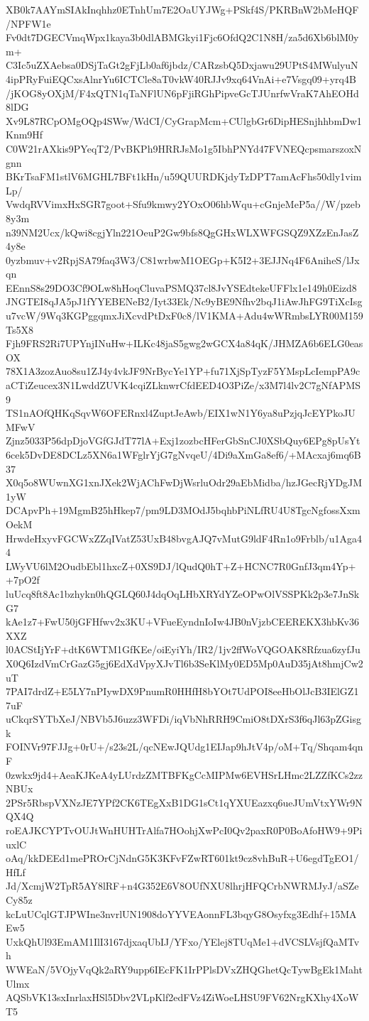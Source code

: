 XB0k7AAYmSIAkInqhhz0ETnhUm7E2OaUYJWg+PSkf4S/PKRBnW2bMeHQF/NPFW1e
Fv0dt7DGECVmqWpx1kaya3b0dlABMGkyi1Fjc6OfdQ2C1N8H/za5d6Xb6blM0ym+
C3Ic5uZXAebsa0DSjTaGt2gFjLb0af6jbdz/CARzsbQ5Dxjawu29UPtS4MWulyuN
4ipPRyFuiEQCxsAlnrYu6ICTCle8aT0vkW40RJJv9xq64VnAi+e7Vsgq09+yrq4B
/jKOG8yOXjM/F4xQTN1qTaNFlUN6pFjiRGhPipveGcTJUnrfwVraK7AhEOHd8lDG
Xv9L87RCpOMgOQp4SWw/WdCI/CyGrapMcm+CUlgbGr6DipHESnjhhbmDw1Knm9Hf
C0W21rAXkis9PYeqT2/PvBKPh9HRRJsMo1g5IbhPNYd47FVNEQcpsmarszoxNgnn
BKrTsaFM1stlV6MGHL7BFt1kHn/u59QUURDKjdyTzDPT7amAcFhs50dly1vimLp/
VwdqRVVimxHxSGR7goot+Sfu9kmwy2YOxO06hbWqu+cGnjeMeP5a//W/pzeb8y3m
n39NM2Ucx/kQwi8cgjYln221OeuP2Gw9bfs8QgGHxWLXWFGSQZ9XZzEnJasZ4y8e
0yzbmuv+v2RpjSA79faq3W3/C81wrbwM1OEGp+K5I2+3EJJNq4F6AniheS/lJxqn
EEnnS8s29DO3Cf9OLw8hHoqCluvaPSMQ37cl8JvYSEdtekeUFFlx1e149h0Eizd8
JNGTEI8qJA5pJ1fYYEBENeB2/Iyt33Ek/Nc9yBE9Nfhv2bqJ1iAwJhFG9TiXcIsg
u7vcW/9Wq3KGPggqmxJiXcvdPtDxF0c8/lV1KMA+Adu4wWRmbsLYR00M159Ts5X8
Fjh9FRS2Ri7UPYnjINuHw+ILKc48jaS5gwg2wGCX4a84qK/JHMZA6b6ELG0easOX
78X1A3zozAuo8su1ZJ4y4vkJF9NrBycYe1YP+fu71XjSpTyzF5YMspLcIempPA9c
aCTiZeucex3N1LwddZUVK4cqiZLknwrCfdEED4O3PiZe/x3M7l4lv2C7gNfAPMS9
TS1nAOfQHKqSqvW6OFERnxl4ZuptJeAwb/EIX1wN1Y6ya8uPzjqJcEYPkoJUMFwV
Zjnz5033P56dpDjoVGfGJdT77lA+Exj1zozbcHFerGbSnCJ0XSbQuy6EPg8pUsYt
6cek5DvDE8DCLz5XN6a1WFglrYjG7gNvqeU/4Di9aXmGa8ef6/+MAcxaj6mq6B37
X0q5o8WUwnXG1xnJXek2WjAChFwDjWsrluOdr29aEbMidba/hzJGecRjYDgJM1yW
DCApvPh+19MgmB25hHkep7/pm9LD3MOdJ5bqhbPiNLfRU4U8TgcNgfossXxmOekM
HrwdeHxyvFGCWxZZqIVatZ53UxB48bvgAJQ7vMutG9ldF4Rn1o9Frblb/u1Aga44
LWyVU6lM2OudbEbl1hxcZ+0XS9DJ/lQudQ0hT+Z+HCNC7R0GnfJ3qm4Yp++7pO2f
luUcq8ft8Ac1bzhykn0hQGLQ60J4dqOqLHbXRYdYZeOPwOlVSSPKk2p3e7JnSkG7
kAe1z7+FwU50jGFHfwv2x3KU+VFueEyndnIoIw4JB0nVjzbCEEREKX3hbKv36XXZ
l0ACStIjYrF+dtK6WTM1GfKEe/oiEyiYh/IR2/1jv2ffWoVQGOAK8Rfzua6zyfJu
X0Q6IzdVmCrGazG5gj6EdXdVpyXJvTl6b3SeKlMy0ED5Mp0AuD35jAt8hmjCw2uT
7PAI7drdZ+E5LY7nPIywDX9PnumR0HHfH8bYOt7UdPOI8eeHbOlJcB3IElGZ17uF
uCkqrSYTbXeJ/NBVb5J6uzz3WFDi/iqVbNhRRH9CmiO8tDXrS3f6qJl63pZGisgk
FOINVr97FJJg+0rU+/s23s2L/qcNEwJQUdg1EIJap9hJtV4p/oM+Tq/Shqam4qnF
0zwkx9jd4+AeaKJKeA4yLUrdzZMTBFKgCcMIPMw6EVHSrLHmc2LZZfKCs2zzNBUx
2PSr5RbspVXNzJE7YPf2CK6TEgXxB1DG1sCt1qYXUEazxq6ueJUmVtxYWr9NQX4Q
roEAJKCYPTvOUJtWnHUHTrAlfa7HOohjXwPcI0Qv2paxR0P0BoAfoHW9+9PiuxlC
oAq/kkDEEd1mePROrCjNdnG5K3KFvFZwRT601kt9cz8vhBuR+U6egdTgEO1/HfLf
Jd/XcmjW2TpR5AY8lRF+n4G352E6V8OUfNXU8lhrjHFQCrbNWRMJyJ/aSZeCy85z
kcLuUCqlGTJPWIne3nvrlUN1908doYYVEAonnFL3bqyG8Osyfxg3Edhf+15MAEw5
UxkQhUl93EmAM1IlI3167djxaqUbIJ/YFxo/YElej8TUqMe1+dVCSLVsjfQaMTvh
WWEaN/5VOjyVqQk2aRY9upp6IEcFK1IrPPlsDVxZHQGhetQcTywBgEk1MahtUlmx
AQSbVK13sxInrlaxHSl5Dbv2VLpKlf2edFVz4ZiWoeLHSU9FV62NrgKXhy4XoWT5

